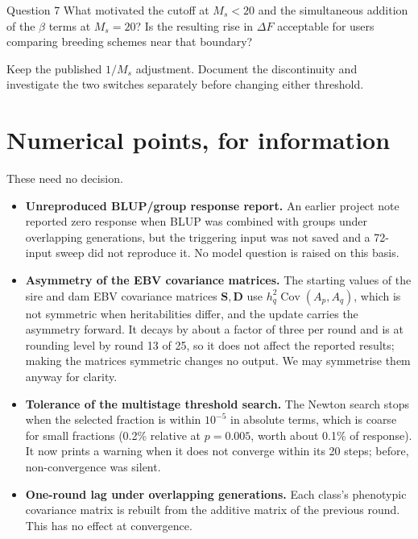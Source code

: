 \documentclass[11pt]{article}
\newcommand{\ma}[1]{\mathbf{#1}}
\newcommand{\Cov}{\operatorname{Cov}}
\begin{document}
\begin{question}{Question 7}
What motivated the cutoff at $M_s<20$ and the simultaneous addition of the $\beta$ terms at $M_s=20$? Is the resulting rise in $\Delta F$ acceptable for users comparing breeding schemes near that boundary?
\end{question}
\begin{recommend}
Keep the published $1/M_s$ adjustment. Document the discontinuity and investigate the two switches separately before changing either threshold.
\end{recommend}

\section{Numerical points, for information}\label{sec:numerics}
These need no decision.
\begin{itemize}
\item \textbf{Unreproduced BLUP/group response report.} An earlier project note reported zero response when BLUP was combined with groups under overlapping generations, but the triggering input was not saved and a 72-input sweep did not reproduce it. No model question is raised on this basis.
\item \textbf{Asymmetry of the EBV covariance matrices.} The starting values of the sire and dam EBV covariance matrices $\ma S,\ma D$ use $h_q^2\Cov(A_p,A_q)$, which is not symmetric when heritabilities differ, and the update carries the asymmetry forward. It decays by about a factor of three per round and is at rounding level by round 13 of 25, so it does not affect the reported results; making the matrices symmetric changes no output. We may symmetrise them anyway for clarity.
\item \textbf{Tolerance of the multistage threshold search.} The Newton search stops when the selected fraction is within $10^{-5}$ in absolute terms, which is coarse for small fractions (0.2\% relative at $p=0.005$, worth about 0.1\% of response). It now prints a warning when it does not converge within its 20 steps; before, non-convergence was silent.
\item \textbf{One-round lag under overlapping generations.} Each class's phenotypic covariance matrix is rebuilt from the additive matrix of the previous round. This has no effect at convergence.
\end{itemize}

\end{document}
